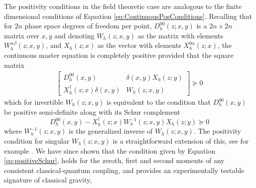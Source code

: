 \documentclass[aps,pra,showpacs,citeautoscript,amsmath,amssymb,floatfix,superscriptaddress,bbm, verbatim,amsfonts,changes,10pt,nofootinbib,longbibliography]{revtex4-1}
\def\z{{z}}
\def\rate{{W}}
\def\ab{^{\alpha\beta}}
\begin{document}
The positivity conditions in the field theoretic case are analogous to the finite dimensional conditions of Equation \eqref{eq:ContinuousPosConditions}. Recalling that for $2n$ phase space degrees of freedom per point, $D_{h}^{00}(\z;x,y)$ is a $2n\times 2n$ matrix over $x,y$ and denoting $\rate_h(\z;x,y)$ as the matrix with elements  $\rate_h\ab(\z;x,y)$, and $X_h(\z;x)$ as the vector with elements $X_h^{0\alpha}(\z;x)$, the continuous master equation is completely positive
provided that the square matrix
\begin{align}
\label{eq:positivity_continuous_field}
\begin{bmatrix}
D_h^{00}(x,y) & \delta(x,y) X_h(\z;y)\\ X_h^\dagger(\z;x)\delta(x,y) & \rate_h(\z;x,y)
\end{bmatrix} 
 \succeq 0 
\end{align}
which for invertible $\rate_h(\z;x,y)$ is equivalent to the condition that $D_h^{00}(x,y)$ be positive semi-definite along with its Schur complement
\begin{equation}
D_h^{00}(x,y) - X_h^\dagger(\z;x)\rate_h^{-1}(\z;x,y) X_h(\z;y) \succeq 0
 \label{eq:positiveSchur}
\end{equation}
where $\rate_h^{-1}(\z;x,y)$ is the generalized inverse of $\rate_h(\z;x,y)$. The positivity condition for singular $\rate_h(\z;x,y)$ is a straightforward extension of this, see for example \cite{boyd2004convex}. We have since shown that the condition given by Equation \eqref{eq:positiveSchur}, holds for the zeroth, first and second moments of any consistent classical-quantum coupling, and provides an experimentally testable signature of classical gravity\cite{oppenheim2021gravitationally},
\end{document}
